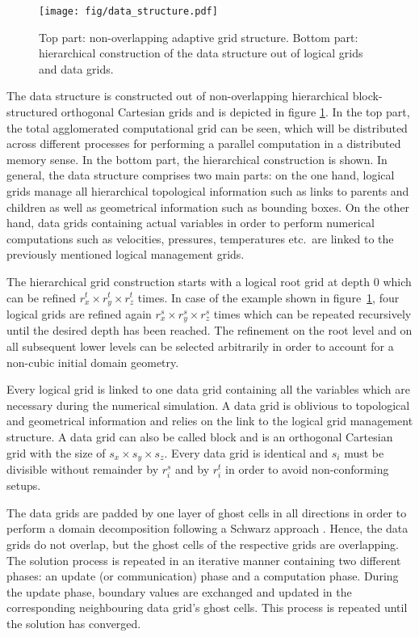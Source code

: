 \documentclass[10pt, conference]{IEEEtran}
\begin{document}
\begin{figure}[!ht]
	\centering
		\texttt{[image: fig/data\_structure.pdf]}
	\caption{Top part: non-overlapping adaptive grid structure. Bottom part: hierarchical construction of the data structure out of logical grids and data grids.}
	\label{fig:data_structure}
\end{figure}

The data structure is constructed out of non-overlapping hierarchical block-structured orthogonal Cartesian grids and is depicted in figure \ref{fig:data_structure}. In the top part, the total
agglomerated computational grid can be seen, which will be distributed across different processes for performing a parallel computation in a distributed memory sense. In the bottom part, the
hierarchical construction is shown. In general, the data structure comprises two main parts: on the one hand, logical grids manage all hierarchical topological information such as links to parents
and children as well as geometrical information such as bounding boxes. On the other hand, data grids containing actual variables in order to perform numerical computations such as velocities,
pressures, temperatures etc.\ are linked to the previously mentioned logical management grids.

The hierarchical grid construction starts with a logical root grid at depth 0 which can be refined $r_x^t\times r_y^t \times r_z^t$ times. In case of the example shown in
figure~\ref{fig:data_structure}, four logical grids are refined again $r_x^s \times r_y^s \times r_z^s$ times which can be repeated recursively until the desired depth has been reached. The
refinement on the root level and on all subsequent lower levels can be selected arbitrarily in order to account for a non-cubic initial domain geometry.

Every logical grid is linked to one data grid containing all the variables which are necessary during the numerical simulation. A data grid is oblivious to topological and geometrical information and
relies on the link to the logical grid management structure. A data grid can also be called block and is an orthogonal Cartesian grid with the size of $s_x \times s_y \times s_z$. Every data grid is
identical and $s_i$ must be divisible without remainder by $r_i^s$ and by $r_i^t$ in order to avoid non-conforming setups.

The data grids are padded by one layer of ghost cells in all directions in order to perform a domain decomposition following a Schwarz approach \cite{Schwarz1870}. Hence, the data grids do
not overlap, but the ghost cells of the respective grids are overlapping. The solution process is repeated in an iterative manner containing two different phases: an update (or communication)
phase and a computation phase. During the update phase, boundary values are exchanged and updated in the corresponding neighbouring data grid's ghost cells. This process is repeated until
the solution has converged.
\end{document}
